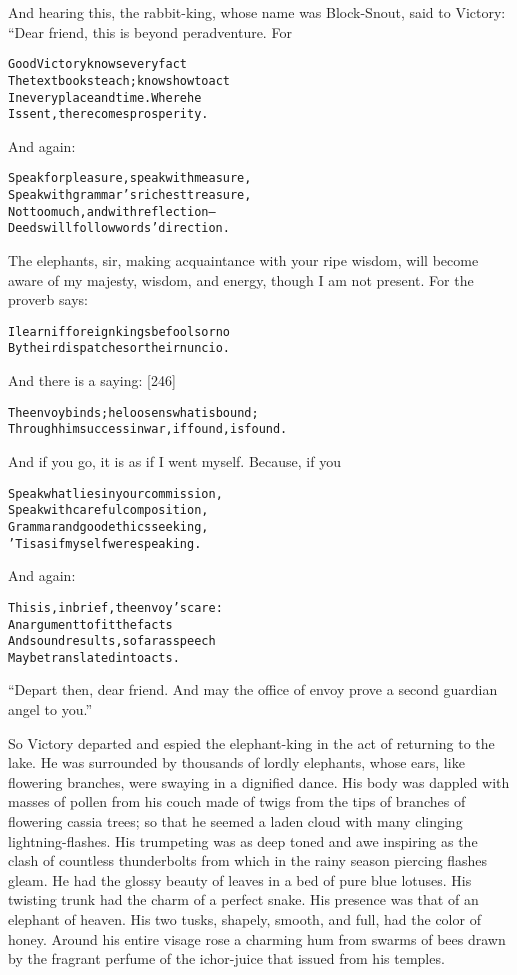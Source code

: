\documentclass{article}
\renewenvironment{verbatim}{\begin{alltt}\normalfont\begin{centering}}{\end{centering}\end{alltt}}
\begin{document}
And hearing this, the rabbit-king, whose name was Block-Snout, said
to Victory: “Dear friend, this is beyond peradventure. For

\begin{verbatim}
Good Victory knows every fact
The textbooks teach; knows how to act
In every place and time. Where he
Is sent, there comes prosperity.
\end{verbatim}
And again:

\begin{verbatim}
Speak for pleasure, speak with measure,
Speak with grammar's richest treasure,
Not too much, and with reflection--
Deeds will follow words' direction.
\end{verbatim}
The elephants, sir, making acquaintance with your ripe wisdom, will
become aware of my majesty, wisdom, and energy, though I am not
present. For the proverb says:

\begin{verbatim}
I learn if foreign kings be fools or no
By their dispatches or their nuncio.
\end{verbatim}
And there is a saying: [246]

\begin{verbatim}
The envoy binds; he loosens what is bound;
Through him success in war, if found, is found.
\end{verbatim}
And if you go, it is as if I went myself. Because, if you

\begin{verbatim}
Speak what lies in your commission,
Speak with careful composition,
Grammar and good ethics seeking,
'Tis as if myself were speaking.
\end{verbatim}
And again:

\begin{verbatim}
This is, in brief, the envoy's care:
    An argument to fit the facts
And sound results, so far as speech
    May be translated into acts.
\end{verbatim}
``Depart then, dear friend. And may the office of envoy prove a second guardian angel to you.''

So Victory departed and espied the elephant-king in the act of
returning to the lake. He was surrounded by thousands of lordly
elephants, whose ears, like flowering branches, were swaying in a
dignified dance. His body was dappled with masses of pollen from
his couch made of twigs from the tips of branches of flowering
cassia trees; so that he seemed a laden cloud with many clinging
lightning-flashes. His trumpeting was as deep toned and awe
inspiring as the clash of countless thunderbolts from which in the
rainy season piercing flashes gleam. He had the glossy beauty of
leaves in a bed of pure blue lotuses. His twisting trunk had the
charm of a perfect snake. His presence was that of an elephant of
heaven. His two tusks, shapely, smooth, and full, had the color of
honey. Around his entire visage rose a charming hum from swarms of
bees drawn by the fragrant perfume of the ichor-juice that issued
from his temples.
\end{document}

